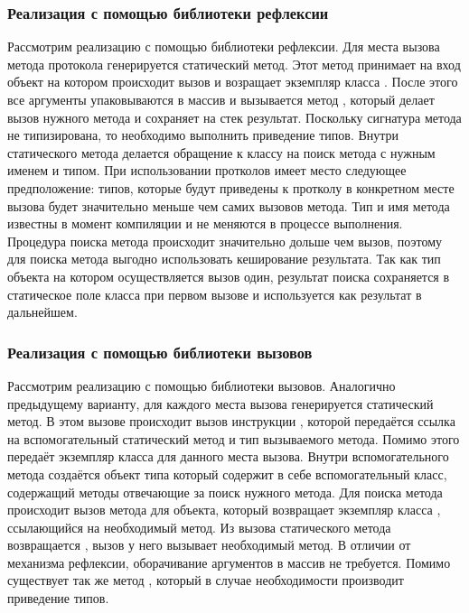\subsubsection{Реализация с помощью библиотеки рефлексии}
Рассмотрим реализацию с помощью библиотеки рефлексии. Для места вызова метода протокола генерируется статический метод. Этот метод принимает на вход объект на котором происходит вызов и возращает экземпляр класса . После этого все аргументы упаковываются в массив и вызывается метод , который делает вызов нужного метода и сохраняет на стек результат. Поскольку сигнатура метода  не типизирована, то необходимо выполнить приведение типов. Внутри статического метода делается обращение к классу на поиск метода с нужным именем и типом. При использовании протколов имеет место следующее предположение: типов, которые будут приведены к протколу в конкретном месте вызова будет значительно меньше чем самих вызовов метода. Тип и имя метода известны в момент компиляции и не меняются в процессе выполнения. Процедура поиска метода происходит значительно дольше чем вызов, поэтому для поиска метода выгодно использовать кеширование результата. Так как тип объекта на котором осуществляется вызов один, результат поиска сохраняется в статическое поле класса при первом вызове и используется как результат в дальнейшем.

\subsubsection{Реализация с помощью библиотеки вызовов}
  Рассмотрим реализацию с помощью библиотеки вызовов. Аналогично предыдущему варианту, для каждого места вызова генерируется статический метод. В этом вызове происходит вызов инструкции , которой передаётся ссылка на вспомогательный статический метод и тип вызываемого метода. Помимо этого  передаёт экземпляр класса  для данного места вызова. Внутри вспомогательного метода создаётся объект типа  который содержит в себе вспомогательный класс, содержащий методы отвечающие за поиск нужного метода. Для поиска метода происходит вызов метода  для объекта, который возвращает экземпляр класса , ссылающийся на необходимый метод. Из вызова статического метода возвращается , вызов у него  вызывает необходимый метод. В отличии от механизма рефлексии, оборачивание аргументов в массив не требуется. Помимо  существует так же метод , который в случае необходимости производит приведение типов.

